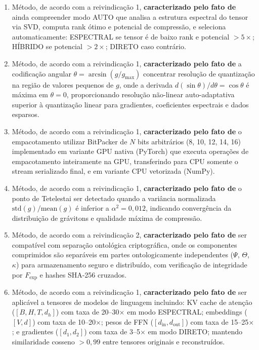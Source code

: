 \documentclass[12pt,a4paper]{article}
\begin{document}
\begin{enumerate}[leftmargin=*, label=\textbf{\arabic*.}]
\item Método, de acordo com a reivindicação 1, \textbf{caracterizado pelo fato de} ainda compreender modo AUTO que analisa a estrutura espectral do tensor via SVD, computa rank ótimo e potencial de compressão, e seleciona automaticamente: ESPECTRAL se tensor é de baixo rank e potencial $> 5\times$; HÍBRIDO se potencial $> 2\times$; DIRETO caso contrário.

\item Método, de acordo com a reivindicação 1, \textbf{caracterizado pelo fato de} a codificação angular $\theta = \arcsin(g/g_{\max})$ concentrar resolução de quantização na região de valores pequenos de $g$, onde a derivada $d(\sin\theta)/d\theta = \cos\theta$ é máxima em $\theta = 0$, proporcionando resolução não-linear auto-adaptativa superior à quantização linear para gradientes, coeficientes espectrais e dados esparsos.

\item Método, de acordo com a reivindicação 1, \textbf{caracterizado pelo fato de} o empacotamento utilizar BitPacker de $N$ bits arbitrários (8, 10, 12, 14, 16) implementado em variante GPU nativa (PyTorch) que executa operações de empacotamento inteiramente na GPU, transferindo para CPU somente o stream serializado final, e em variante CPU vetorizada (NumPy).

\item Método, de acordo com a reivindicação 1, \textbf{caracterizado pelo fato de} o ponto de Tetelestai ser detectado quando a variância normalizada $\text{std}(g)/\text{mean}(g)$ é inferior a $\alpha^2 = 0{,}012$, indicando convergência da distribuição de grávitons e qualidade máxima de compressão.

\item Método, de acordo com a reivindicação 2, \textbf{caracterizado pelo fato de} ser compatível com separação ontológica criptográfica, onde os componentes comprimidos são separáveis em partes ontologicamente independentes ($\Psi$, $\Theta$, $\kappa$) para armazenamento seguro e distribuído, com verificação de integridade por $F_{\text{exp}}$ e hashes SHA-256 cruzados.

\item Método, de acordo com a reivindicação 1, \textbf{caracterizado pelo fato de} ser aplicável a tensores de modelos de linguagem incluindo: KV cache de atenção ($[B, H, T, d_h]$) com taxa de 20--30$\times$ em modo ESPECTRAL; embeddings ($[V, d]$) com taxa de 10--20$\times$; pesos de FFN ($[d_{\text{in}}, d_{\text{out}}]$) com taxa de 15--25$\times$; e gradientes ($[d_1, d_2]$) com taxa de 3--5$\times$ em modo DIRETO; mantendo similaridade cosseno $> 0{,}99$ entre tensores originais e reconstruídos.


\end{enumerate}
\end{document}
